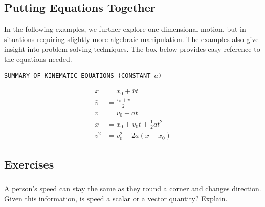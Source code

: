 \documentclass[main-ap-physics.tex]{subfiles}
\begin{document}
\subsection*{Putting Equations Together}

In the following examples, we further explore one-dimensional motion, but in situations requiring slightly more algebraic manipulation. The examples also give insight into problem-solving techniques. The box below provides easy reference to the equations needed.

\vspace{1em}

\cyanhrule

\begin{center}
    \texttt{SUMMARY OF KINEMATIC EQUATIONS (CONSTANT $a$)}
\end{center}

\vspace{-2em}

\begin{align}
    x &= x_0 + \bar{v} t \\[1ex]
    \bar{v} &= \frac{v_0 + v}{2} \\[1ex]
    v &= v_0 + at \\[1ex]
    x &= x_0 + v_0t + \frac{1}{2} a t^2 \\[1ex]
    v^2 &= v_0^2 + 2a (x - x_0)
\end{align}

\cyanhrule

\clearpage

\subsection{Exercises}

\subsubsection*{} %

\begin{exercise} \label{hJNNqd}
    A person's speed can stay the same as they round a corner and changes direction. Given this information, is speed a scalar or a vector quantity? Explain.
\end{exercise}

\subsubsection*{} %
\end{document}
